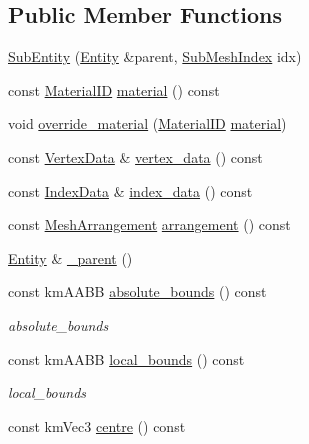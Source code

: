 \subsection*{Public Member Functions}
\begin{DoxyCompactItemize}
\item 
\hyperlink{classkglt_1_1_sub_entity_a0d2fe0c160ab5e655ab9133740f16add}{Sub\-Entity} (\hyperlink{classkglt_1_1_entity}{Entity} \&parent, \hyperlink{namespacekglt_aa750d1bb3b7a0d679b32c96fed625213}{Sub\-Mesh\-Index} idx)
\item 
const \hyperlink{namespacekglt_a5ffac6377a7d3e163b4d5c31f71db43a}{Material\-I\-D} \hyperlink{classkglt_1_1_sub_entity_afc3e5411f229a9f6b2c52c077efb2cdb}{material} () const 
\item 
void \hyperlink{classkglt_1_1_sub_entity_ae77dffa76c617355e147ed155691cfb5}{override\-\_\-material} (\hyperlink{namespacekglt_a5ffac6377a7d3e163b4d5c31f71db43a}{Material\-I\-D} \hyperlink{classkglt_1_1_sub_entity_afc3e5411f229a9f6b2c52c077efb2cdb}{material})
\item 
const \hyperlink{classkglt_1_1_vertex_data}{Vertex\-Data} \& \hyperlink{classkglt_1_1_sub_entity_aea6499bbcf0d0be122a9772e4c550979}{vertex\-\_\-data} () const 
\item 
const \hyperlink{classkglt_1_1_index_data}{Index\-Data} \& \hyperlink{classkglt_1_1_sub_entity_a24876a49babb1d15b06d1bf3bbde0c70}{index\-\_\-data} () const 
\item 
const \hyperlink{namespacekglt_a4d5a692708f38d0176dd6f5d341289da}{Mesh\-Arrangement} \hyperlink{classkglt_1_1_sub_entity_a9bab589e0e4d2b50e14dc1ed459563b2}{arrangement} () const 
\item 
\hyperlink{classkglt_1_1_entity}{Entity} \& \hyperlink{classkglt_1_1_sub_entity_a9bbfa6f5446d592e2b5c83ca3a47ee90}{\-\_\-parent} ()
\item 
const km\-A\-A\-B\-B \hyperlink{classkglt_1_1_sub_entity_a5f0d73906dfb5a4602f9596dd99e8153}{absolute\-\_\-bounds} () const 
\begin{DoxyCompactList}\small\item\em absolute\-\_\-bounds \end{DoxyCompactList}\item 
const km\-A\-A\-B\-B \hyperlink{classkglt_1_1_sub_entity_a51b67565fcc0a7957b0dda4c14eb5bf0}{local\-\_\-bounds} () const 
\begin{DoxyCompactList}\small\item\em local\-\_\-bounds \end{DoxyCompactList}\item 
const km\-Vec3 \hyperlink{classkglt_1_1_sub_entity_a4ed41b7539519980274e1683ae4f7c7a}{centre} () const 
\end{DoxyCompactItemize}

